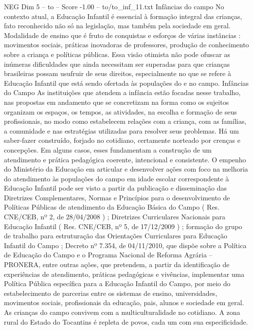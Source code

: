\begin{textsample}{NEG Dim 5 – to – Score -1.00 – to/to\_inf\_11.txt}  \label{ex:f5_neg_264}
Infâncias do campo No contexto atual, a Educação Infantil é essencial à formação integral das crianças, fato reconhecido não só na legislação, mas também pela sociedade em geral.
Modalidade de ensino que é fruto de conquistas e esforços de várias instâncias : movimentos sociais, práticas inovadoras de professores, produção de conhecimento sobre a criança e políticas públicas.
Essa visão otimista não pode ofuscar as inúmeras dificuldades que ainda necessitam ser superadas para que crianças brasileiras possam usufruir de seus direitos, especialmente no que se refere à Educação Infantil que está sendo ofertada às populações do e no campo.
Infâncias do Campo As instituições que atendem a infância estão focadas nesse trabalho, nas propostas em andamento que se concretizam na forma como os sujeitos organizam os espaços, os tempos, as atividades, na escolha e formação de seus profissionais, no modo como estabelecem relações com a criança, com as famílias, a comunidade e nas estratégias utilizadas para resolver seus problemas.
Há um saber-fazer construído, forjado no cotidiano, certamente norteado por crenças e concepções.
Em alguns casos, esses fundamentam a construção de um atendimento e prática pedagógica coerente, intencional e consistente.
O empenho do Ministério da Educação em articular e desenvolver ações com foco na melhoria do atendimento às populações do campo em idade escolar correspondente à Educação Infantil pode ser visto a partir da publicação e disseminação das Diretrizes Complementares, Normas e Princípios para o desenvolvimento de Políticas Públicas de atendimento da Educação Básica do Campo ( Res.
CNE/CEB, nº 2, de 28/04/2008 ) ; Diretrizes Curriculares Nacionais para Educação Infantil ( Res.
CNE/CEB, nº 5, de 17/12/2009 ) ; formação do grupo de trabalho para estruturação das Orientações Curriculares para Educação Infantil do Campo ; Decreto nº 7.354, de 04/11/2010, que dispõe sobre a Política de Educação do Campo e o Programa Nacional de Reforma Agrária – PRONERA, entre outras ações, que pretendem, a partir da identificação de experiências de atendimento, práticas pedagógicas e vivências, implementar uma Política Pública específica para a Educação Infantil do Campo, por meio do estabelecimento de parcerias entre os sistemas de ensino, universidades, movimentos sociais, profissionais da educação, pais, alunos e sociedade em geral.
As crianças do campo convivem com a multiculturalidade no cotidiano.
A zona rural do Estado do Tocantins é repleta de povos, cada um com sua especificidade.

\end{textsample}
